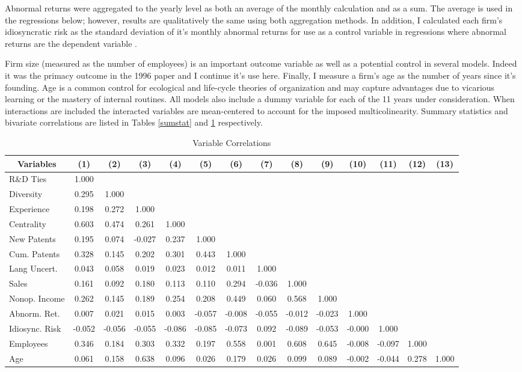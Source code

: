 Abnormal returns were aggregated to the yearly level as both an average of the monthly calculation and as a sum. The average is used in the regressions below; however, results are qualitatively the same using both aggregation methods. In addition, I calculated each firm's idiosyncratic risk as the standard deviation of it's monthly abnormal returns for use as a control variable in regressions where abnormal returns are the dependent variable \citep{sorescu2008}.

Firm size (measured as the number of employees) is an important outcome variable as well as a potential control in several models. Indeed it was the primacy outcome in the 1996 paper and I continue it's use here. Finally, I measure a firm's age as the number of years since it's founding. Age is a common control for ecological and life-cycle theories of organization \citep{powell1999} and may capture advantages due to vicarious learning or the mastery of internal routines. All models also include a dummy variable for each of the 11 years under consideration. When interactions are included the interacted variables are mean-centered to account for the imposed multicolinearity. Summary statistics and bivariate correlations are listed in Tables \ref{sumstat} and \ref{corrtable} respectively.


\begin{landscape}
\begin{table}[htbp]\centering \caption{Variable Correlations\label{corrtable}}
\begin{tabular}{l  c  c  c  c  c  c  c  c  c  c  c  c  c }\hline\hline
\multicolumn{1}{c}{Variables} &(1)&(2)&(3)&(4)&(5)&(6)&(7)&(8)&(9)&(10)&(11)&(12)&(13)\\ \hline
R\&D Ties&1.000\\
Diversity&0.295&1.000\\
Experience&0.198&0.272&1.000\\
Centrality&0.603&0.474&0.261&1.000\\
New Patents&0.195&0.074&-0.027&0.237&1.000\\
Cum. Patents&0.328&0.145&0.202&0.301&0.443&1.000\\
Lang Uncert.&0.043&0.058&0.019&0.023&0.012&0.011&1.000\\
Sales&0.161&0.092&0.180&0.113&0.110&0.294&-0.036&1.000\\
Nonop. Income&0.262&0.145&0.189&0.254&0.208&0.449&0.060&0.568&1.000\\
Abnorm. Ret.&0.007&0.021&0.015&0.003&-0.057&-0.008&-0.055&-0.012&-0.023&1.000\\
Idiosync. Risk&-0.052&-0.056&-0.055&-0.086&-0.085&-0.073&0.092&-0.089&-0.053&-0.000&1.000\\
Employees&0.346&0.184&0.303&0.332&0.197&0.558&0.001&0.608&0.645&-0.008&-0.097&1.000\\
Age&0.061&0.158&0.638&0.096&0.026&0.179&0.026&0.099&0.089&-0.002&-0.044&0.278&1.000\\
\hline \hline 
 \end{tabular}
\end{table}
\end{landscape}


